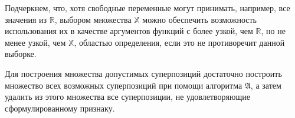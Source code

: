 \documentclass[12pt,a4paper]{article}
\begin{document}
Подчеркнем, что, хотя свободные переменные могут принимать, например, все
значения из $\mathbb{R}$, выбором множества $\mathbb{X}$ можно обеспечить
возможность использования их в качестве аргументов функций с более узкой,
чем $\mathbb{R}$, но не менее узкой, чем $\mathbb{X}$, областью определения,
если это не противоречит данной выборке.

Для построения множества допустимых суперпозиций достаточно построить
множество всех возможных суперпозиций при помощи алгоритма $\mathfrak{A}$,
а затем удалить из этого множества все суперпозиции, не удовлетворяющие
сформулированному признаку.

\end{document}
